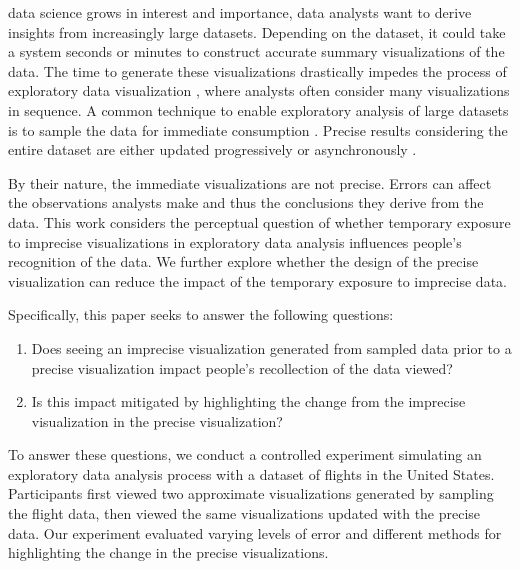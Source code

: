 \documentclass[10pt,journal,compsoc]{IEEEtran}
\begin{document}
% 
% 
% 
% 
 data science grows in interest and importance, data analysts want to derive insights from increasingly large datasets.
Depending on the dataset, it could take a system seconds or minutes to construct accurate summary visualizations of the data.
The time to generate these visualizations drastically impedes the process of exploratory data visualization \cite{liu2014effects}, where analysts often consider many visualizations in sequence.
A common technique to enable exploratory analysis of large datasets is to sample the data for immediate consumption \cite{moritz2017pangloss}.
Precise results considering the entire dataset are either updated progressively \cite{fisher2012trust} or asynchronously \cite{moritz2017pangloss, kay2016ish}.

By their nature, the immediate visualizations are not precise.
Errors can affect the observations analysts make and thus the conclusions they derive from the data.
This work considers the perceptual question of whether temporary exposure to imprecise visualizations in exploratory data analysis influences people's recognition of the data.
We further explore whether the design of the precise visualization can reduce the impact of the temporary exposure to imprecise data.

Specifically, this paper seeks to answer the following questions:
\begin{enumerate}
\item Does seeing an imprecise visualization generated from sampled data prior to a precise visualization impact people's recollection of the data viewed?
\item Is this impact mitigated by highlighting the change from the imprecise visualization in the precise visualization?
\end{enumerate}

To answer these questions, we conduct a controlled experiment simulating an exploratory data analysis process with a dataset of flights in the United States.
Participants first viewed two approximate visualizations generated by sampling the flight data, then viewed the same visualizations updated with the precise data.
Our experiment evaluated varying levels of error and different methods for highlighting the change in the precise visualizations.
\end{document}
